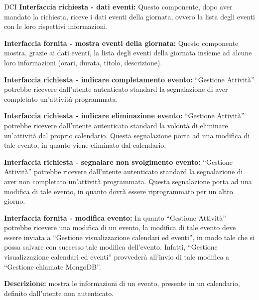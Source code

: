 \begin{listaPersonale}{DCI}
    \textbf{Interfaccia richiesta - dati eventi:} Questo componente, dopo aver mandato la richiesta, riceve i dati eventi della giornata, ovvero la lista degli eventi con le loro rispettivi informazioni.

    \textbf{Interfaccia fornita - mostra eventi della giornata:} Questo componente mostra, grazie ai dati eventi, la lista degli eventi della giornata insieme ad alcune loro informazioni (orari, durata, titolo, descrizione).

    \textbf{Interfaccia richiesta - indicare completamento evento:} “Gestione Attività” potrebbe ricevere dall'utente autenticato standard la segnalazione di aver completato un'attività programmata.

    \textbf{Interfaccia richiesta - indicare eliminazione evento:} “Gestione Attività” potrebbe ricevere dall'utente autenticato standard la volontà di eliminare un'attività dal proprio calendario. Questa segnalazione porta ad una modifica di tale evento, in quanto viene eliminato dal calendario.

    \textbf{Interfaccia richiesta - segnalare non svolgimento evento:} “Gestione Attività” potrebbe ricevere dall'utente autenticato standard la segnalazione di aver non completato un'attività programmata.  Questa segnalazione porta ad una modifica di tale evento, in quanto dovrà essere riprogrammato per un altro giorno.

    \textbf{Interfaccia fornita - modifica evento:} In quanto “Gestione Attività” potrebbe ricevere una modifica di un evento, la modifica di tale evento deve essere inviata a “Gestione visualizzazione calendari ed eventi”, in modo tale che si possa salvare con successo tale modifica dell'evento. Infatti, “Gestione visualizzazione calendari ed eventi” provvederà all'invio di tale modifica a “Gestione chiamate MongoDB”.



    \textbf{Descrizione:} mostra le informazioni di un evento, presente in un calendario, definito dall'utente non autenticato.


\end{listaPersonale}
